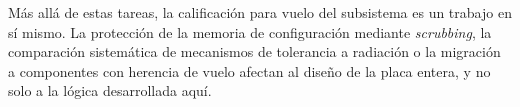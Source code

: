 Más allá de estas tareas, la calificación para vuelo del subsistema es un trabajo en sí mismo. La
protección de la memoria de configuración mediante \textit{scrubbing}, la comparación sistemática
de mecanismos de tolerancia a radiación o la migración a componentes con herencia de vuelo afectan
al diseño de la placa entera, y no solo a la lógica desarrollada aquí.
